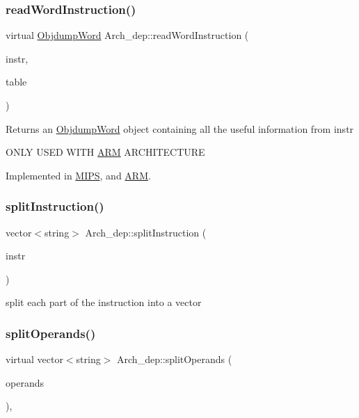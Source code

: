 \subsubsection{\texorpdfstring{read\+Word\+Instruction()}{readWordInstruction()}}
{\footnotesize\ttfamily virtual \hyperlink{classObjdumpWord}{Objdump\+Word} Arch\+\_\+dep\+::read\+Word\+Instruction (\begin{DoxyParamCaption}\item[{const \hyperlink{classObjdumpInstruction}{Objdump\+Instruction} \&}]{instr,  }\item[{\hyperlink{classObjdumpSymbolTable}{Objdump\+Symbol\+Table} \&}]{table }\end{DoxyParamCaption})\hspace{0.3cm}{\ttfamily [pure virtual]}}

Returns an \hyperlink{classObjdumpWord}{Objdump\+Word} object containing all the useful information from instr

O\+N\+LY U\+S\+ED W\+I\+TH \hyperlink{classARM}{A\+RM} A\+R\+C\+H\+I\+T\+E\+C\+T\+U\+RE 

Implemented in \hyperlink{classMIPS_a28a3d7f0cc8a69881d46dfa1363351cf}{M\+I\+PS}, and \hyperlink{classARM_ac39db2497e0931f632be7c57ecfc932a}{A\+RM}.

\mbox{\label{classArch__dep_af07d99baab6b3f496f50bd44277f762e}} 
\subsubsection{\texorpdfstring{split\+Instruction()}{splitInstruction()}}
{\footnotesize\ttfamily vector$<$string$>$ Arch\+\_\+dep\+::split\+Instruction (\begin{DoxyParamCaption}\item[{const string \&}]{instr }\end{DoxyParamCaption})}

split each part of the instruction into a vector \mbox{\label{classArch__dep_abf3061756ea53bc4eb3c2447fca9fb5c}} 
\subsubsection{\texorpdfstring{split\+Operands()}{splitOperands()}}
{\footnotesize\ttfamily virtual vector$<$string$>$ Arch\+\_\+dep\+::split\+Operands (\begin{DoxyParamCaption}\item[{const string \&}]{operands }\end{DoxyParamCaption})\hspace{0.3cm}{\ttfamily [protected]}, {}}

